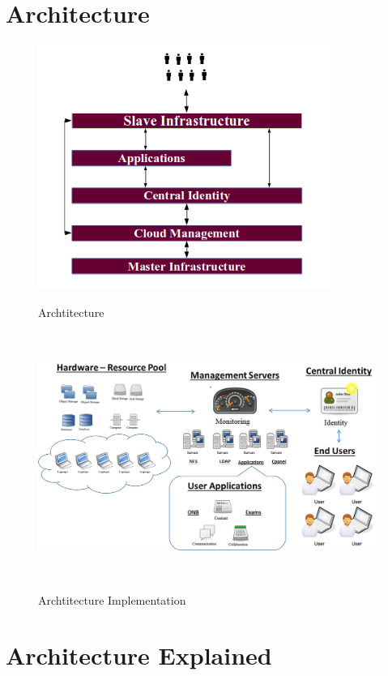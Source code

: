 \documentclass[]{article}
\begin{document}
\section{Architecture}
\begin{center}

\begin{figure}[H]
 \includegraphics[height=8cm]{./idea.png} \\
 \caption{Archtitecture\label{fig:idea}} 
\end{figure}

\begin{figure}[H]
 \includegraphics[height=8cm]{./all.png} \\
 \caption{Archtitecture Implementation\label{fig:all}} 
\end{figure}

\end{center}

\pagebreak

\section{Architecture Explained }
\end{document}
